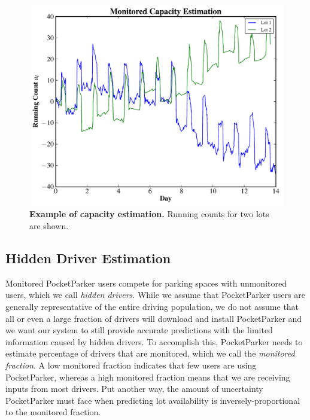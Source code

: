 \begin{figure}
\centering
\includegraphics[width=\columnwidth]{./simulator/figures/capacity.pdf}

\caption{\textbf{Example of capacity estimation.} Running counts for two lots
are shown.}

\label{fig-capacityexample}
\end{figure}

\subsection{Hidden Driver Estimation}
\label{subsec-hidden}

Monitored PocketParker users compete for parking spaces with unmonitored
users, which we call \textit{hidden drivers}. While we assume that
PocketParker users are generally representative of the entire driving
population, we do not assume that all or even a large fraction of drivers
will download and install PocketParker and we want our system to still
provide accurate predictions with the limited information caused by hidden
drivers. To accomplish this, PocketParker needs to estimate percentage of
drivers that are monitored, which we call the \textit{monitored fraction}. A
low monitored fraction indicates that few users are using PocketParker,
whereas a high monitored fraction means that we are receiving inputs from
most drivers. Put another way, the amount of uncertainty PocketParker must
face when predicting lot availability is inversely-proportional to the
monitored fraction.

